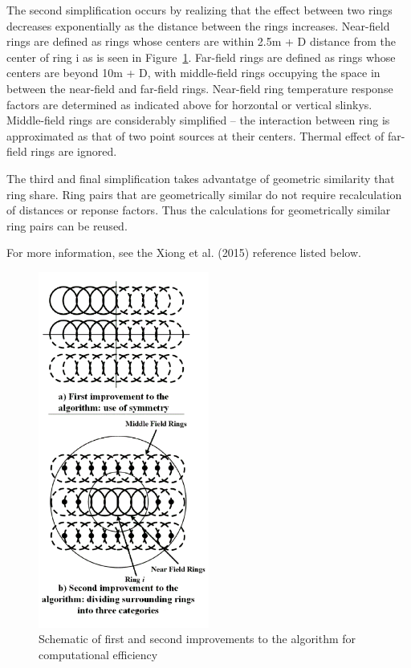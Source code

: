 The second simplification occurs by realizing that the effect between two rings decreases exponentially as the distance between the rings increases. Near-field rings are defined as rings whose centers are within 2.5m + D distance from the center of ring i as is seen in Figure~\ref{fig:slinky-first-and-second-improvements}. Far-field rings are defined as rings whose centers are beyond 10m + D, with middle-field rings occupying the space in between the near-field and far-field rings. Near-field ring temperature response factors are determined as indicated above for horzontal or vertical slinkys. Middle-field rings are considerably simplified -- the interaction between ring is approximated as that of two point sources at their centers. Thermal effect of far-field rings are ignored.

The third and final simplification takes advantatge of geometric similarity that ring share. Ring pairs that are geometrically similar do not require recalculation of distances or reponse factors. Thus the calculations for geometrically similar ring pairs can be reused.

For more information, see the Xiong et al. (2015) reference listed below.

\begin{figure}[htbp]
\centering
\includegraphics[width=0.5\textwidth]{media/image8001.png}
\caption{Schematic of first and second improvements to the algorithm for computational efficiency \protect \label{fig:slinky-first-and-second-improvements}}
\end{figure}


